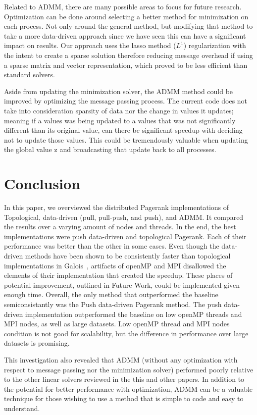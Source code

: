 \documentclass[letterpaper,11pt,onecolumn]{article}
\begin{document}
Related to ADMM, there are many possible areas to focus for future research. Optimization can be done around selecting a better method for minimization on each process. Not only around the general method, but modifying that method to take a more data-driven approach since we have seen this can have a significant impact on results. Our approach uses the lasso method ($L^{1}$) regularization with the intent to create a sparse solution therefore reducing message overhead if using a sparse matrix and vector representation, which proved to be less efficient than standard solvers.

Aside from updating the minimization solver, the ADMM method could be improved by optimizing the message passing process. The current code does not take into consideration sparsity of data nor the change in values it updates; meaning if a values was being updated to a values that was not significantly different than its original value, can there be significant speedup with deciding not to update those values. This could be tremendously valuable when updating the global value z and broadcasting that update back to all processes.


\section{Conclusion}

In this paper, we overviewed the distributed Pagerank implementations of Topological, data-driven (pull, pull-push, and push), and ADMM. It compared the results over a varying amount of nodes and threads. In the end, the best implementations were push data-driven and topological Pagerank. Each of their performance was better than the other in some cases. Even though the data-driven methods have been shown to be consistently faster than topological implementations in Galois~\cite{Joyce}, artifacts of openMP and MPI disallowed the elements of their implementation that created the speedup. These places of potential improvement, outlined in Future Work, could be implemented given enough time. Overall, the only method that outperformed the baseline semiconsistantly was the Push data-driven Pagerank method. The push data-driven implementation outperformed the baseline on low openMP threads and MPI nodes, as well as large datasets. Low openMP thread and MPI nodes condition is not good for scalability, but the difference in performance over large datasets is promising. 

This investigation also revealed that ADMM (without any optimization with respect to message passing nor the minimization solver) performed poorly relative to the other linear solvers reviewed in the this and other papers. In addition to the potential for better performance with optimization, ADMM can be a valuable technique for those wishing to use a method that is simple to code and easy to understand. 
\end{document}
